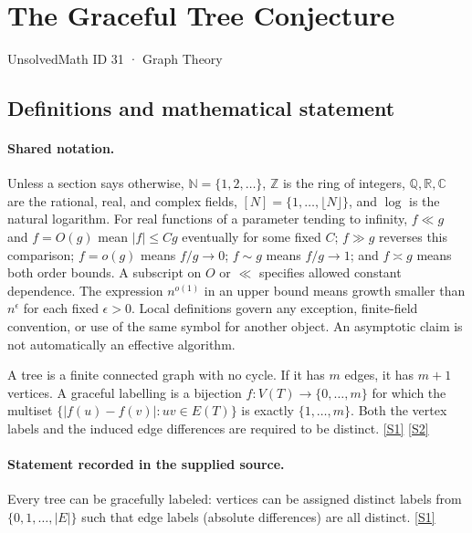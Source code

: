 \documentclass[11pt,a4paper]{article}
\newcommand{\N}{\mathbb{N}}
\newcommand{\Z}{\mathbb{Z}}
\newcommand{\Q}{\mathbb{Q}}
\newcommand{\R}{\mathbb{R}}
\newcommand{\C}{\mathbb{C}}
\newcommand{\sref}[2]{\hyperlink{source:#1:#2}{[S#2]}}
\begin{document}

\setcounter{section}{30}

\section{The Graceful Tree Conjecture}\label{31}

{\small\sffamily UnsolvedMath ID 31 · Graph Theory}

\subsection{Definitions and mathematical statement}

\paragraph{Shared notation.}Unless a section says otherwise, $\N=\{1,2,\ldots\}$,
$\Z$ is the ring of integers, $\Q,\R,\C$ are the rational, real, and complex
fields, $[N]=\{1,\ldots,\lfloor N\rfloor\}$, and $\log$ is the natural
logarithm. For real functions of a parameter tending to infinity,
$f\ll g$ and $f=O(g)$ mean $|f|\leq Cg$ eventually for some fixed $C$;
$f\gg g$ reverses this comparison; $f=o(g)$ means $f/g\to0$;
$f\sim g$ means $f/g\to1$; and $f\asymp g$ means both order bounds.
A subscript on $O$ or $\ll$ specifies allowed constant dependence.
The expression $n^{o(1)}$ in an upper bound means growth smaller than
$n^\epsilon$ for each fixed $\epsilon>0$. Local definitions govern any
exception, finite-field convention, or use of the same symbol for another
object. An asymptotic claim is not automatically an effective algorithm.



A tree is a finite connected graph with no cycle. If it has $m$ edges, it has $m+1$ vertices. A graceful labelling is a bijection $f:V(T)\to\{0,\ldots,m\}$ for which the multiset $\{|f(u)-f(v)|:uv\in E(T)\}$ is exactly $\{1,\ldots,m\}$. Both the vertex labels and the induced edge differences are required to be distinct. \sref{31}{1} \sref{31}{2}

\paragraph{Statement recorded in the supplied source.}
Every tree can be gracefully labeled: vertices can be assigned distinct labels from $\{0, 1, \ldots, |E|\}$ such that edge labels (absolute differences) are all distinct. \sref{31}{1}
\end{document}
